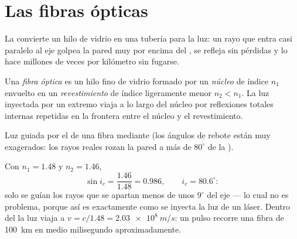 \section{Las fibras ópticas}

La  convierte un hilo de vidrio en una tubería
para la luz: un rayo que entra casi paralelo al eje golpea la pared muy
por encima del , se refleja sin pérdidas y lo hace millones
de veces por kilómetro sin fugarse.

\begin{definition}\label{def:g10:refraction:fiber}
Una \emph{fibra óptica} es un hilo fino de vidrio
formado por un \emph{núcleo} de índice $n_1$ envuelto en
un \emph{revestimiento} de índice ligeramente menor
$n_2 < n_1$. La luz inyectada por un extremo viaja a lo largo del núcleo
por reflexiones totales internas repetidas en la frontera entre el
núcleo y el revestimiento.
\end{definition}

\begin{omfigure}

{\small Luz guiada por el  de una fibra mediante  (los ángulos de rebote están muy exagerados: los rayos reales
rozan la pared a más de $80^\circ$ de la ).}
\end{omfigure}

\begin{example}\label{ex:g10:refraction:fibernumbers}
Con $n_1 = 1.48$ y $n_2 = 1.46$,
\[
\sin i_c = \frac{1.46}{1.48} = 0.986,
\qquad i_c = 80.6^\circ :
\]
solo se guían los rayos que se apartan menos de unos $9^\circ$ del eje
--- lo cual no es problema, porque así es exactamente como se inyecta la
luz de un láser. Dentro del  la luz viaja a
$v = c/1.48 = \qty{2.03e8}{m/s}$: un pulso recorre una fibra de
\qty{100}{km} en medio milisegundo aproximadamente.
\end{example}

